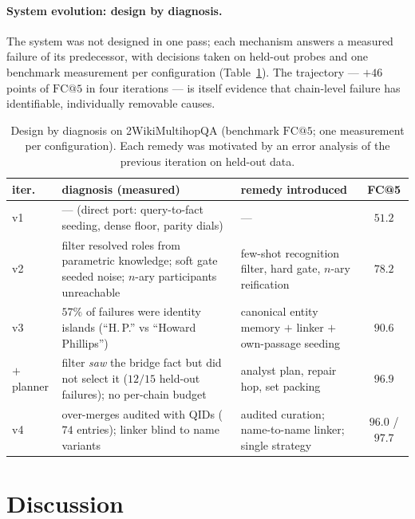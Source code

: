 \documentclass[11pt,a4paper]{article}
\begin{document}
\paragraph{System evolution: design by diagnosis.} The system was not
designed in one pass; each mechanism answers a measured failure of its
predecessor, with decisions taken on held-out probes and one benchmark
measurement per configuration (Table~\ref{tab:evolution}). The trajectory
--- $+46$ points of $\mathrm{FC@}5$ in four iterations --- is itself
evidence that chain-level failure has identifiable, individually removable
causes.

\begin{table}[t]
\centering\small\setlength{\tabcolsep}{4pt}
\caption{Design by diagnosis on 2WikiMultihopQA (benchmark $\mathrm{FC@}5$;
one measurement per configuration). Each remedy was motivated by an error
analysis of the previous iteration on held-out data.}
\label{tab:evolution}
\begin{tabular}{lp{}p{}c}
\toprule
iter. & diagnosis (measured) & remedy introduced & FC@5\\
\midrule
v1 & --- (direct port: query-to-fact seeding, dense floor, parity dials) & --- & $51.2$\\
v2 & filter resolved roles from parametric knowledge; soft gate seeded noise; $n$-ary participants unreachable & few-shot recognition filter, hard gate, $n$-ary reification & $78.2$\\
v3 & $57\%$ of failures were identity islands (``H.\,P.'' vs ``Howard Phillips'') & canonical entity memory $+$ linker $+$ own-passage seeding & $90.6$\\
$+$planner & filter \emph{saw} the bridge fact but did not select it ($12/15$ held-out failures); no per-chain budget & analyst plan, repair hop, set packing & $96.9$\\
v4 & over-merges audited with QIDs ($74$ entries); linker blind to name variants & audited curation; name-to-name linker; single strategy & $96.0$ / $\mathbf{97.7}$\\
\bottomrule
\end{tabular}
\end{table}

\section{Discussion}
\label{sec:discussion}
\end{document}
